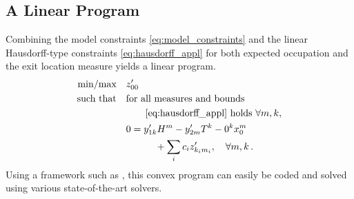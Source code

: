 \subsection{A Linear Program}
Combining the model constraints \eqref{eq:model_constraints} and the linear Hausdorff-type constraints \eqref{eq:hausdorff_appl} for both expected occupation and the exit location measure yields a linear program.
\begin{equation}\label{eq:lp_for_fpt}
    \begin{split}
	    \text{min} / \text{max} \hspace{1em}&  z_{00}^{\prime} \\
        \text{such that}\hspace{1em} & \text{for all measures and bounds}\\
        &\qquad\eqref{eq:hausdorff_appl}\text{ holds }\forall m, k,\\
        & 0= y_{1k}' H^m -  y_{2m}'T^k - 0^k x_0^m \\
	    &\qquad\quad+\sum_i c_i  z_{k_i m_i}', \quad\forall m, k\,.
    \end{split}
\end{equation}
Using a framework such as , this convex program can easily be coded and solved using various state-of-the-art solvers.

